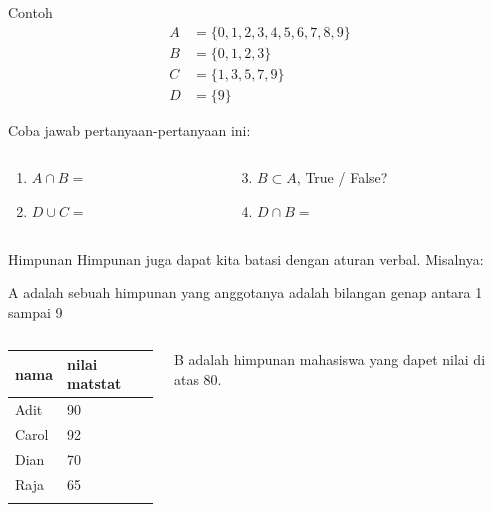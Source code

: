 \documentclass[
  ignorenonframetext,
]{beamer}
\providecommand{\tightlist}{%
  \setlength{\itemsep}{0pt}\setlength{\parskip}{0pt}}\usepackage{longtable,booktabs,array}
\begin{document}
\begin{frame}{Contoh}
\label{contoh-1}
\[
\begin{align*}
A&=\{0,1,2,3,4,5,6,7,8,9\} \\
B&=\{0,1,2,3\} \\
C&=\{1,3,5,7,9\} \\
D&=\{9\}
\end{align*}
\]

Coba jawab pertanyaan-pertanyaan ini:

\begin{columns}[T]
\begin{column}{0.47\textwidth}
\begin{enumerate}
\tightlist
\item
  \(A \cap B=\)
\item
  \(D \cup C=\)
\end{enumerate}
\end{column}

\begin{column}{0.47\textwidth}
\begin{enumerate}
\setcounter{enumi}{2}
\tightlist
\item
  \(B \subset A\), True / False?
\item
  \(D \cap B=\)
\end{enumerate}
\end{column}
\end{columns}
\end{frame}

\begin{frame}{Himpunan}
\label{himpunan-1}
Himpunan juga dapat kita batasi dengan aturan verbal. Misalnya:

A adalah sebuah himpunan yang anggotanya adalah bilangan genap antara 1
sampai 9

\begin{columns}[T]
\begin{column}{0.47\textwidth}
\begin{longtable}[]{@{}ll@{}}
\toprule\noalign{}
nama & nilai matstat \\
\midrule\noalign{}
\endhead
Adit & 90 \\
Carol & 92 \\
Dian & 70 \\
Raja & 65 \\
\bottomrule\noalign{}
\end{longtable}
\end{column}

\begin{column}{0.47\textwidth}
B adalah himpunan mahasiswa yang dapet nilai di atas 80.
\end{column}
\end{columns}
\end{frame}
\end{document}
